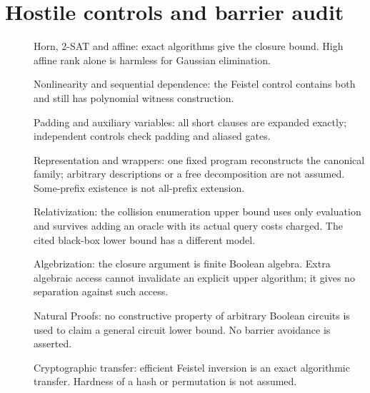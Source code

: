 \documentclass[11pt]{article}
\begin{document}
\section*{Hostile controls and barrier audit}
\begin{description}
\item[] Horn, 2-SAT and affine: exact algorithms give the closure bound.
High affine rank alone is harmless for Gaussian elimination.
\item[] Nonlinearity and sequential dependence: the Feistel control
contains both and still has polynomial witness construction.
\item[] Padding and auxiliary variables: all short clauses are expanded
exactly; independent controls check padding and aliased gates.
\item[] Representation and wrappers: one fixed program reconstructs
the canonical family; arbitrary descriptions or a free decomposition
are not assumed. Some-prefix existence is not all-prefix extension.
\item[] Relativization: the collision enumeration upper bound uses only
evaluation and survives adding an oracle with its actual query costs
charged. The cited black-box lower bound has a different model.
\item[] Algebrization: the closure argument is finite Boolean algebra.
Extra algebraic access cannot invalidate an explicit upper algorithm;
it gives no separation against such access.
\item[] Natural Proofs: no constructive property of arbitrary Boolean
circuits is used to claim a general circuit lower bound. No barrier
avoidance is asserted.
\item[] Cryptographic transfer: efficient Feistel inversion is an exact
algorithmic transfer. Hardness of a hash or permutation is not assumed.
\end{description}
\end{document}
